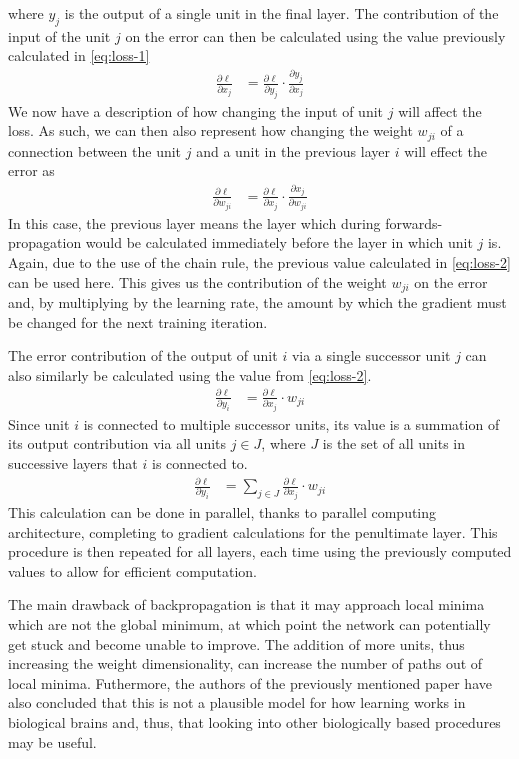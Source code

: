 where $y_j$ is the output of a single unit in the final layer.
The contribution of the input of the unit $j$ on the error can then be calculated using the value previously calculated in \eqref{eq:loss-1}
\begin{align}\label{eq:loss-2}
	\frac{\partial\ell}{\partial x_j} &= \frac{\partial \ell}{\partial y_j} \cdot \frac{\partial y_j}{\partial x_j}
\end{align}
We now have a description of how changing the input of unit $j$ will affect the loss.
As such, we can then also represent how changing the weight $w_{ji}$ of a connection between the unit $j$ and a unit in the previous layer $i$ will effect the error as
\begin{align}\label{eq:loss-3}
	\frac{\partial \ell}{\partial w_{ji}} &= \frac{\partial \ell}{\partial x_j} \cdot \frac{\partial x_j}{\partial w_{ji}}
\end{align}
In this case, the previous layer means the layer which during forwards-propagation would be calculated immediately before the layer in which unit $j$ is.
Again, due to the use of the chain rule, the previous value calculated in \eqref{eq:loss-2} can be used here.
This gives us the contribution of the weight $w_{ji}$ on the error and, by multiplying by the learning rate, the amount by which the gradient must be changed for the next training iteration.

The error contribution of the output of unit $i$ via a single successor unit $j$ can also similarly be calculated using the value from \eqref{eq:loss-2}.
\begin{align}\label{eq:loss-4}
	\frac{\partial \ell}{\partial y_i} &= \frac{\partial \ell}{\partial x_j} \cdot w_{ji}
\end{align}
Since unit $i$ is connected to multiple successor units, its value is a summation of its output contribution via all units $j \in J$, where $J$ is the set of all units in successive layers that $i$ is connected to.
\begin{align}
	\frac{\partial \ell}{\partial y_i} &= \sum_{j \in J} \frac{\partial \ell}{\partial x_j} \cdot w_{ji}
\end{align}
This calculation can be done in parallel, thanks to parallel computing architecture, completing to gradient calculations for the penultimate layer.
This procedure is then repeated for all layers, each time using the previously computed values to allow for efficient computation.

The main drawback of backpropagation is that it may approach local minima which are not the global minimum, at which point the network can potentially get stuck and become unable to improve.
The addition of more units, thus increasing the weight dimensionality, can increase the number of paths out of local minima.
Futhermore, the authors of the previously mentioned paper have also concluded that this is not a plausible model for how learning works in biological brains and, thus, that looking into other biologically based procedures may be useful.

